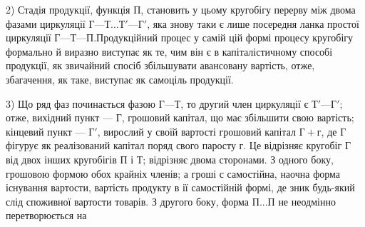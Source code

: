 2) Стадія продукції, функція П, становить у цьому кругобігу перерву
між двома фазами циркуляції $Г — Т... Т' — Г'$, яка знову таки є лише
посередня ланка простої циркуляції $Г — Т — П. П$родукційний процес у
самій цій формі процесу кругобігу формально й виразно виступає як
те, чим він є в капіталістичному способі продукції, як звичайний спосіб
збільшувати авансовану вартість, отже, збагачення, як таке, виступає як
самоціль продукції.

3) Що ряд фаз починається фазою $Г — Т$, то другий член циркуляції
є $Т' — Г'$; отже, вихідний пункт — Г, грошовий капітал, що має збільшити
свою вартість; кінцевий пункт — $Г'$, вирослий у своїй вартості грошовий
капітал $Г + г$, де Г фігурує як реалізований капітал поряд свого
паросту г. Це відрізняє кругобіг Г від двох інших кругобігів П і Т; відрізняє
двома сторонами. З одного боку, грошовою формою обох крайніх членів;
а гроші с самостійна, наочна форма існування вартости, вартість продукту
в ії самостійній формі, де зник будь-який слід споживної вартости
товарів. З другого боку, форма $П... П$ не неодмінно перетворюється на
\parbreak{}  %
